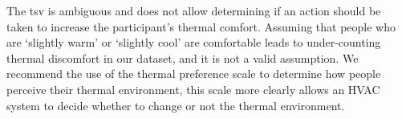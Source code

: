 The \ac{tsv} is ambiguous and does not allow determining if an action should be taken to increase the participant's thermal comfort.
Assuming that people who are `slightly warm' or `slightly cool' are comfortable leads to under-counting thermal discomfort in our dataset, and it is not a valid assumption.
We recommend the use of the thermal preference scale to determine how people perceive their thermal environment, this scale more clearly allows an HVAC system to decide whether to change or not the thermal environment.
